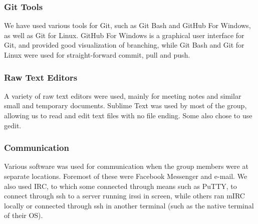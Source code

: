 \subsubsection{Git Tools}
We have used various tools for Git, such as Git Bash and GitHub For Windows, as well as Git for Linux. GitHub For Windows is a graphical user interface for Git, and provided good visualization of branching, while Git Bash and Git for Linux were used for straight-forward commit, pull and push.

\subsubsection{Raw Text Editors}
A variety of raw text editors were used, mainly for meeting notes and similar small and temporary documents. Sublime Text was used by most of the group, allowing us to read and edit text files with no file ending. Some also chose to use gedit.

\subsubsection{Communication}
Various software was used for communication when the group members were at separate locations. Foremost of these were Facebook Messenger and e-mail. We also used IRC, to which some connected through means such as PuTTY, to connect through ssh to a server running irssi in screen, while others ran mIRC locally or connected through ssh in another terminal (such as the native terminal of their OS).
